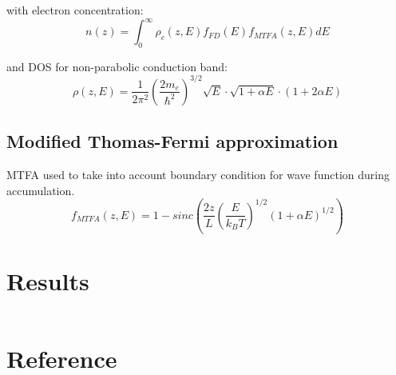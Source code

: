 \documentclass[final, xcolor=cmyk]{beamer}
\begin{document}
\begin{poster}
    with electron concentration:
    $$
        n(z) = \int_{0}^{\infty}\rho_c(z,E) f_{FD}(E) f_{MTFA}(z,E)dE
    $$ 
    
    and  DOS for non-parabolic conduction band:  
    $$
        \rho \left(z,E\right) = \frac{1}{2\pi^2} \left(\frac{2m_{e}}{\hbar^2}\right)^{3/2} \!\!\! \sqrt{E} \cdot \sqrt{1+\alpha E} \cdot \left(1+ 2\alpha E \right)
    $$  
    

\vspace{-1ex}       
\subsection{Modified Thomas-Fermi approximation}
    MTFA used to take into account boundary condition for wave function during accumulation.  
    $$
    f_{MTFA}(z, E)  = 1 - sinc\left( \frac{2z}{L} \left(\frac{E}{k_BT}\right)^{1/2} \left(1+\alpha E\right)^{1/2}\right)
    $$
    
\newcolumn
\section{Results}

\lipsum[1-3]

\begin{columns}
    \figfont
    \newcommand{\figwidth}{\columnwidth}
    \begin{column}{\columnwidth}
        
    \end{column}
\end{columns}

\lipsum[4-10]

\section{Reference}
\footnotesize




\end{poster}
\end{document}
